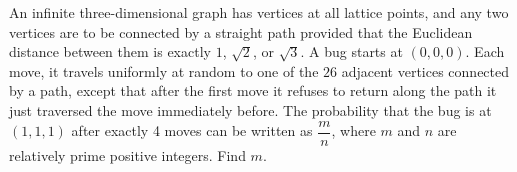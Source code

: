 An infinite three-dimensional graph has vertices at all lattice points, and any two vertices are to be connected by a straight path provided that the Euclidean distance between them is exactly $1$, $\sqrt{2}$, or $\sqrt{3}$. A bug starts at $(0,0,0)$. Each move, it travels uniformly at random to one of the $26$ adjacent vertices connected by a path, except that after the first move it refuses to return along the path it just traversed the move immediately before. The probability that the bug is at $(1,1,1)$ after exactly 4 moves can be written as $\dfrac{m}{n}$, where $m$ and $n$ are relatively prime positive integers. Find $m$.
